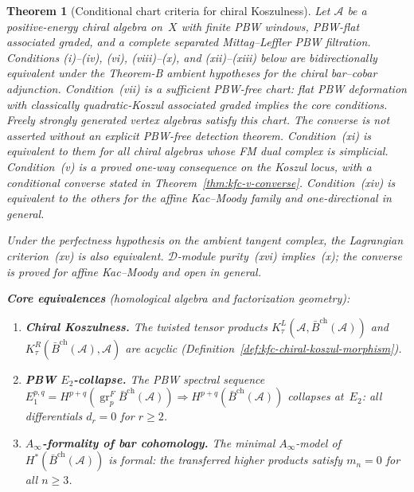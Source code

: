 \documentclass[11pt,reqno]{amsart}
\newtheorem{theorem}{Theorem}[section]
\theoremstyle{definition}
\theoremstyle{remark}
\newcommand{\cA}{\mathcal{A}}
\newcommand{\cD}{\mathcal{D}}
\newcommand{\barBch}{\bar{B}^{\mathrm{ch}}}
\newcommand{\Etwo}{E_2}
\newcommand{\Ainfty}{A_\infty}
\DeclareMathOperator{\gr}{gr}
\numberwithin{equation}{section}
\begin{document}
\begin{theorem}[Conditional chart criteria for chiral Koszulness]
\label{thm:kfc-fourteen}
Let $\cA$ be a positive-energy chiral algebra on~$X$ with finite
PBW windows, PBW-flat associated graded, and a complete separated
Mittag--Leffler PBW filtration. Conditions
\textup{(i)--(iv)}, \textup{(vi)}, \textup{(viii)--(x)}, and
\textup{(xii)--(xiii)} below are bidirectionally equivalent under
the Theorem-B ambient hypotheses for the chiral bar--cobar
adjunction.
Condition~\textup{(vii)} is a sufficient PBW-free chart:
flat PBW deformation with classically quadratic-Koszul associated
graded implies the core conditions. Freely strongly generated
vertex algebras satisfy this chart. The converse is not asserted
without an explicit PBW-free detection theorem.
Condition~\textup{(xi)} is equivalent to them for all chiral
algebras whose FM dual complex is simplicial.
Condition~\textup{(v)} is a proved one-way consequence on the
Koszul locus, with a conditional converse stated in
Theorem~\ref{thm:kfc-v-converse}.
Condition~\textup{(xiv)} is equivalent to the others for the
affine Kac--Moody family and one-directional in general.

Under the perfectness hypothesis on the ambient tangent complex,
the Lagrangian criterion~\textup{(xv)} is also equivalent.
$\cD$-module purity~\textup{(xvi)} implies~\textup{(x)}; the
converse is proved for affine Kac--Moody and open in general.

\medskip
\noindent
\textbf{Core equivalences}
\textup{(homological algebra and factorization geometry):}
\begin{enumerate}[label=\textup{(\roman*)},leftmargin=2.4em]

\item\label{item:kfc-koszul}
\textbf{Chiral Koszulness.}
The twisted tensor products $K_\tau^L(\cA, \barBch(\cA))$ and
$K_\tau^R(\barBch(\cA), \cA)$ are acyclic
\textup{(}Definition~\textup{\ref{def:kfc-chiral-koszul-morphism})}.

\item\label{item:kfc-pbw}
\textbf{PBW $\Etwo$-collapse.}
The PBW spectral sequence
$E_1^{p,q} = H^{p+q}(\gr^F_p \barBch(\cA))
 \Rightarrow H^{p+q}(\barBch(\cA))$
collapses at~$\Etwo$: all differentials $d_r = 0$ for $r \geq 2$.

\item\label{item:kfc-ainfty}
\textbf{$\Ainfty$-formality of bar cohomology.}
The minimal $\Ainfty$-model of $H^*(\barBch(\cA))$
is formal: the transferred higher products satisfy
$m_n = 0$ for all $n \geq 3$.


\end{enumerate}
\end{theorem}
\end{document}
